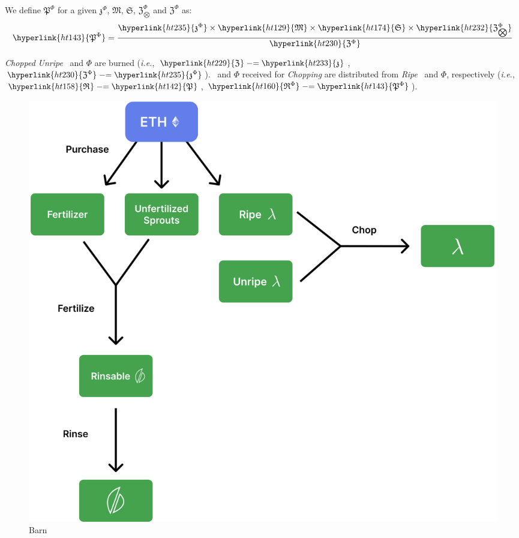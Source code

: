 \documentclass[tikz]{article}
\newcommand{\term}[1]{\textsl{#1}}
\newcommand{\Bean}{} %
\newcommand{\bean}{} %
\begin{document}
We define \hyperlink{ht143}{$\mathfrak{P}^{\Phi}$} for a given \hyperlink{ht235}{$\mathfrak{z}^{\Phi}$}, \hyperlink{ht129}{$\mathfrak{M}$}, \hyperlink{ht174}{$\mathfrak{S}$}, \hyperlink{ht232}{$\mathfrak{Z}_{\bigotimes}^{\Phi}$} and \hyperlink{ht230}{$\mathfrak{Z}^{\Phi}$} as:
$$\hyperlink{ht143}{\mathfrak{P}^{\Phi}} = \frac{\hyperlink{ht235}{\mathfrak{z}^{\Phi}} \times \hyperlink{ht129}{\mathfrak{M}} \times \hyperlink{ht174}{\mathfrak{S}} \times \hyperlink{ht232}{\mathfrak{Z}_{\bigotimes}^{\Phi}}}{\hyperlink{ht230}{\mathfrak{Z}^{\Phi}}}$$

\term{Chopped} \term{Unripe} \Bean\ and \hyperlink{ht187}{$\Phi$} are burned (\term{i.e.}, $\hyperlink{ht229}{\mathfrak{Z}^{\bean}} \mathrel{-}= \hyperlink{ht233}{\mathfrak{z}^{\bean}}$, $\hyperlink{ht230}{\mathfrak{Z}^{\Phi}} \mathrel{-}= \hyperlink{ht235}{\mathfrak{z}^{\Phi}}$). \Bean\ and \hyperlink{ht187}{$\Phi$} received for \term{Chopping} are distributed from \term{Ripe} \Bean\ and \hyperlink{ht187}{$\Phi$}, respectively (\term{i.e.}, $\hyperlink{ht158}{\mathfrak{R}^{\bean}} \mathrel{-}= \hyperlink{ht142}{\mathfrak{P}^{\bean}}$, $\hyperlink{ht160}{\mathfrak{R}^{\Phi}} \mathrel{-}= \hyperlink{ht143}{\mathfrak{P}^{\Phi}}$).

\vspace*{5mm}

\begin{figure}[h!]
    \centering
    \includegraphics[scale=.14]{Figure3} %
    \vspace*{-5mm}
    \caption{Barn}
    \label{fig 3}
\end{figure}
\end{document}
